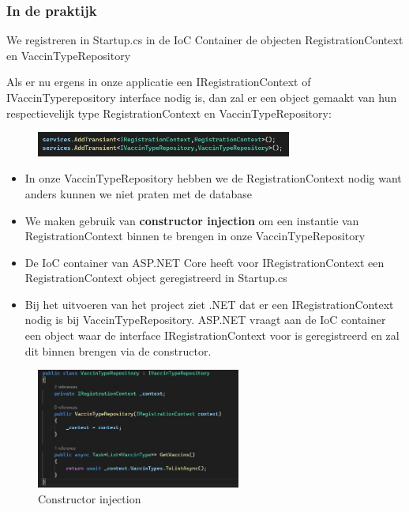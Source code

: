 \documentclass{article}
\begin{document}
\subsubsection{In de praktijk}

We registreren in Startup.cs in de IoC Container de objecten RegistrationContext en VaccinTypeRepository

Als er nu ergens in onze applicatie een IRegistrationContext of IVaccinTyperepository interface nodig is, 
dan zal er een object gemaakt van hun respectievelijk type RegistrationContext en VaccinTypeRepository:

\begin{figure}[H]
    \centering
    \includegraphics[width=0.75\textwidth]{dependency-injection-1.png}
    \caption{}
\end{figure}

\begin{itemize}
    \item In onze VaccinTypeRepository hebben we de RegistrationContext nodig want anders kunnen we niet praten met de database
    \item We maken gebruik van \textbf{constructor injection} om een instantie van RegistrationContext binnen te brengen in onze VaccinTypeRepository
    \item De IoC container van ASP.NET Core heeft voor IRegistrationContext een RegistrationContext object geregistreerd in Startup.cs
    \item Bij het uitvoeren van het project ziet .NET dat er een IRegistrationContext nodig is bij VaccinTypeRepository. ASP.NET vraagt aan de IoC container een object waar de interface IRegistrationContext voor is geregistreerd en zal dit binnen brengen via de constructor.
\end{itemize}

\begin{figure}[H]
    \centering
    \includegraphics[width=0.6\textwidth]{dependency-injection-2.png}
    \caption{Constructor injection}
\end{figure}
\end{document}
